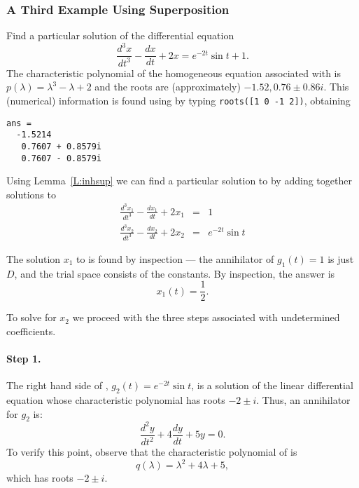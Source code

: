 \documentclass{ximera}
\begin{document}
\subsubsection*{A Third Example Using Superposition}

Find a particular solution of the differential equation
\begin{equation}  \label{e:underdet3}
\frac{d^3x}{dt^3} -\frac{dx}{dt} + 2x = e^{-2t}\sin t + 1.
\end{equation}
The characteristic polynomial of the homogeneous equation associated with 
 is $p(\lambda)=\lambda^3-\lambda+2$ and the roots are 
(approximately) $-1.52, 0.76 \pm 0.86i$.  This (numerical) information is
found using \Matlab by typing 
{\tt roots([1 0 -1 2])}, obtaining
\begin{verbatim}
ans =
  -1.5214       
   0.7607 + 0.8579i     
   0.7607 - 0.8579i
\end{verbatim}

Using Lemma~\ref{L:inhsup} we can find a particular solution to 
 by adding together solutions to 
\begin{eqnarray}
\frac{d^3x_1}{dt^3} -\frac{dx_1}{dt} + 2x_1 & = & 1 \label{e:underdet3-1}\\
\frac{d^3x_2}{dt^3} -\frac{dx_2}{dt} + 2x_2 & = & e^{-2t}\sin t 
\label{e:underdet3-2}
\end{eqnarray}

The solution $x_1$ to  is found by inspection --- the 
annihilator of $g_1(t)=1$ is just $D$, 
and the trial space consists of 
the constants.  By inspection, the answer is 
\[
x_1(t) = \frac{1}{2}.
\]

To solve  for $x_2$ we proceed with the three steps 
associated with undetermined coefficients.

\paragraph{Step 1.} The right hand side of , 
$g_2(t)=e^{-2t}\sin t$, is a solution of the linear differential equation 
whose characteristic polynomial has roots $-2\pm i$.  Thus, an 
annihilator for $g_2$ is:
\begin{equation}  \label{eq:undetcoeffex2}
\frac{d^2y}{dt^2} +4\frac{dy}{dt} +5y = 0.
\end{equation}
To verify this point, observe that the characteristic 
polynomial of  
 is
\[
q(\lambda) = \lambda^2 + 4\lambda +5,
\]
which has roots $-2\pm i$.  
\end{document}
